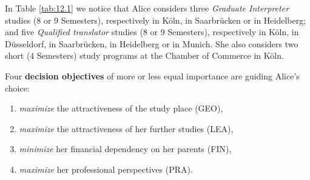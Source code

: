 In Table \ref{tab:12.1} we notice that Alice considers three \emph{Graduate Interpreter} studies (8 or 9 Semesters), respectively in Köln, in Saarbrücken or in Heidelberg; and five \emph{Qualified translator} studies (8 or 9 Semesters), respectively in Köln, in Düsseldorf, in Saarbrücken, in Heidelberg or in Munich. She also considers two short (4 Semesters) study programs at the Chamber of Commerce in Köln. 

Four \textbf{decision objectives} of more or less equal importance are guiding Alice's choice:
\begin{enumerate}
\item \emph{maximize} the attractiveness of the study place (GEO),
\item \emph{maximize} the attractiveness of her further studies (LEA),
\item \emph{minimize}  her financial dependency on her parents (FIN),
\item \emph{maximize} her professional perspectives (PRA).
\end{enumerate}

